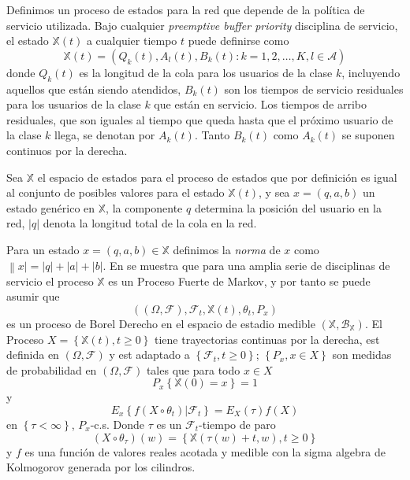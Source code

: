 Definimos un proceso de estados para la red que depende de la
pol\'itica de servicio utilizada. Bajo cualquier {\em preemptive
buffer priority} disciplina de servicio, el estado
$\mathbb{X}\left(t\right)$ a cualquier tiempo $t$ puede definirse
como
\begin{equation}\label{Eq.Esp.Estados}
\mathbb{X}\left(t\right)=\left(Q_{k}\left(t\right),A_{l}\left(t\right),B_{k}\left(t\right):k=1,2,\ldots,K,l\in\mathcal{A}\right)
\end{equation}
donde $Q_{k}\left(t\right)$ es la longitud de la cola para los
usuarios de la clase $k$, incluyendo aquellos que est\'an siendo
atendidos, $B_{k}\left(t\right)$ son los tiempos de servicio
residuales para los usuarios de la clase $k$ que est\'an en
servicio. Los tiempos de arribo residuales, que son iguales al
tiempo que queda hasta que el pr\'oximo usuario de la clase $k$
llega, se denotan por $A_{k}\left(t\right)$. Tanto
$B_{k}\left(t\right)$ como $A_{k}\left(t\right)$ se suponen
continuos por la derecha.

Sea $\mathbb{X}$ el espacio de estados para el proceso de estados
que por definici\'on es igual  al conjunto de posibles valores
para el estado $\mathbb{X}\left(t\right)$, y sea
$x=\left(q,a,b\right)$ un estado gen\'erico en $\mathbb{X}$, la
componente $q$ determina la posici\'on del usuario en la red,
$|q|$ denota la longitud total de la cola en la red.

Para un estado $x=\left(q,a,b\right)\in\mathbb{X}$ definimos la
{\em norma} de $x$ como $\left\|x\right|=|q|+|a|+|b|$. En
\cite{Dai} se muestra que para una amplia serie de disciplinas de
servicio el proceso $\mathbb{X}$ es un Proceso Fuerte de Markov, y
por tanto se puede asumir que
\[\left(\left(\Omega,\mathcal{F}\right),\mathcal{F}_{t},\mathbb{X}\left(t\right),\theta_{t},P_{x}\right)\]
es un proceso de Borel Derecho en el espacio de estadio medible
$\left(\mathbb{X},\mathcal{B}_{\mathbb{X}}\right)$. El Proceso
$X=\left\{\mathbb{X}\left(t\right),t\geq0\right\}$ tiene
trayectorias continuas por la derecha, est definida en
$\left(\Omega,\mathcal{F}\right)$ y est adaptado a
$\left\{\mathcal{F}_{t},t\geq0\right\}$; $\left\{P_{x},x\in
X\right\}$ son medidas de probabilidad en
$\left(\Omega,\mathcal{F}\right)$ tales que para todo $x\in X$
\[P_{x}\left\{\mathbb{X}\left(0\right)=x\right\}=1\] y
\[E_{x}\left\{f\left(X\circ\theta_{t}\right)|\mathcal{F}_{t}\right\}=E_{X}\left(\tau\right)f\left(X\right)\]
en $\left\{\tau<\infty\right\}$, $P_{x}$-c.s. Donde $\tau$ es un
$\mathcal{F}_{t}$-tiempo de paro
\[\left(X\circ\theta_{\tau}\right)\left(w\right)=\left\{\mathbb{X}\left(\tau\left(w\right)+t,w\right),t\geq0\right\}\]
y $f$ es una funci\'on de valores reales acotada y medible con la
sigma algebra de Kolmogorov generada por los cilindros.

